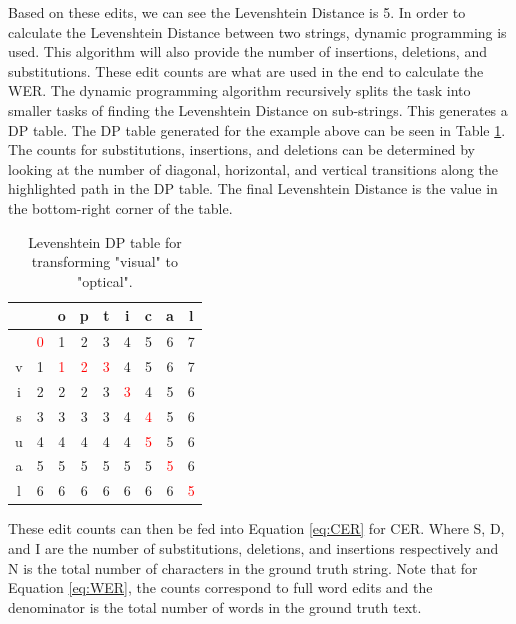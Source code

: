 \documentclass[a4paper,11pt]{article}
\begin{document}
\noindent
Based on these edits, we can see the Levenshtein Distance is 5. In order to calculate the Levenshtein Distance between two strings, dynamic programming is used. This algorithm will also provide the number of insertions, deletions, and substitutions. These edit counts are what are used in the end to calculate the WER. The dynamic programming algorithm recursively splits the task into smaller tasks of finding the Levenshtein Distance on sub-strings. This generates a DP table. The DP table generated for the example above can be seen in Table \ref{tab:levenshtein_table}. The counts for substitutions, insertions, and deletions can be determined by looking at the number of diagonal, horizontal, and vertical transitions along the highlighted path in the DP table. The final Levenshtein Distance is the value in the bottom-right corner of the table. \cite{levenshtein-dist}

\begin{table}[H]
\begin{center}
\caption{Levenshtein DP table for transforming "visual" to "optical".}
\begin{tabular}{ c|c c c c c c c c } 
  &   & o & p & t & i & c & a & l \\ \hline
  & \textcolor{red}{0} & 1 & 2 & 3 & 4 & 5 & 6 & 7 \\
 v & 1 & \textcolor{red}{1} & \textcolor{red}{2} & \textcolor{red}{3} & 4 & 5 & 6 & 7 \\
 i & 2 & 2 & 2 & 3 & \textcolor{red}{3} & 4 & 5 & 6 \\
 s & 3 & 3 & 3 & 3 & 4 & \textcolor{red}{4} & 5 & 6 \\
 u & 4 & 4 & 4 & 4 & 4 & \textcolor{red}{5} & 5 & 6 \\
 a & 5 & 5 & 5 & 5 & 5 & 5 & \textcolor{red}{5} & 6 \\
 l & 6 & 6 & 6 & 6 & 6 & 6 & 6 & \textcolor{red}{5} \\
\end{tabular}
\label{tab:levenshtein_table}
\end{center}
\end{table}

\noindent
These edit counts can then be fed into Equation \ref{eq:CER} for CER. Where S, D, and I are the number of substitutions, deletions, and insertions respectively and N is the total number of characters in the ground truth string. Note that for Equation \ref{eq:WER}, the counts correspond to full word edits and the denominator is the total number of words in the ground truth text. \cite{wer-metric}
\end{document}
